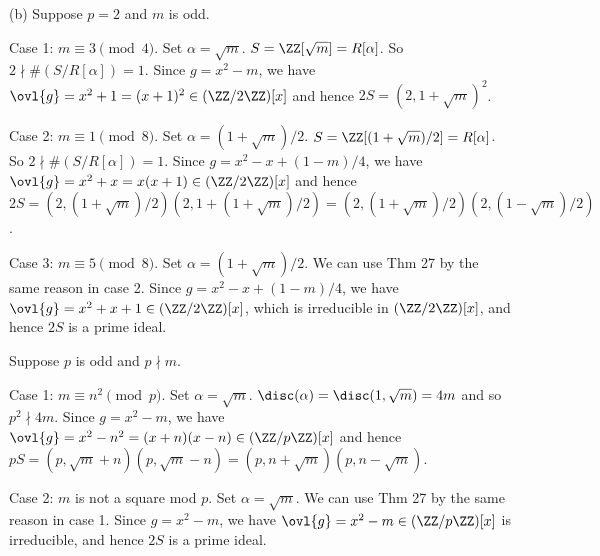 \documentclass[../Chapter.tex]{subfiles}
\begin{document}
(b) Suppose $p=2$ and $m$ is odd.

Case 1: $m\equiv3\pmod{4}$. Set $\alpha=\sqrt{m}$. $S=\ZZ[\sqrt{m}]=R[\alpha]$. So $2\nmid \#(S/R[\alpha])=1$. Since $g=x^2-m$, we have $\ovl{g}=x^2+1=(x+1)^2\in(\ZZ/2\ZZ)[x]$ and hence $2S=(2,1+\sqrt{m})^2$.

Case 2: $m\equiv1\pmod{8}$. Set $\alpha=(1+\sqrt{m})/2$. $S=\ZZ[(1+\sqrt{m})/2]=R[\alpha]$. So $2\nmid \#(S/R[\alpha])=1$. Since $g=x^2-x+(1-m)/4$, we have $\ovl{g}=x^2+x=x(x+1)\in(\ZZ/2\ZZ)[x]$ and hence $2S=(2,(1+\sqrt{m})/2)(2,1+(1+\sqrt{m})/2)=(2,(1+\sqrt{m})/2)(2,(1-\sqrt{m})/2)$.

Case 3: $m\equiv5\pmod{8}$. Set $\alpha=(1+\sqrt{m})/2$. We can use Thm 27 by the same reason in case 2. Since $g=x^2-x+(1-m)/4$, we have $\ovl{g}=x^2+x+1\in(\ZZ/2\ZZ)[x]$, which is irreducible in $(\ZZ/2\ZZ)[x]$, and hence $2S$ is a prime ideal.

Suppose $p$ is odd and $p\nmid m$.

Case 1: $m\equiv n^2\pmod{p}$. Set $\alpha=\sqrt{m}$. $\disc(\alpha)=\disc(1,\sqrt{m})=4m$ and so $p^2\nmid 4m$. Since $g=x^2-m$, we have $\ovl{g}=x^2-n^2=(x+n)(x-n)\in(\ZZ/p\ZZ)[x]$ and hence $pS=(p,\sqrt{m}+n)(p,\sqrt{m}-n)=(p,n+\sqrt{m})(p,n-\sqrt{m})$.

Case 2: $m$ is not a square mod $p$. Set $\alpha=\sqrt{m}$. We can use Thm 27 by the same reason in case 1. Since $g=x^2-m$, we have $\ovl{g}=x^2-m\in(\ZZ/p\ZZ)[x]$ is irreducible, and hence $2S$ is a prime ideal.
\end{document}
